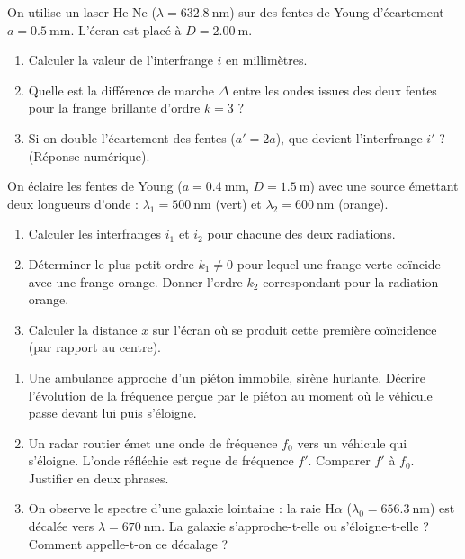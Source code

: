 \documentclass[11pt]{article}
\begin{document}
\begin{exercice}
On utilise un laser He-Ne ($\lambda = \SI{632,8}{\nano\meter}$) sur des fentes de Young d'écartement $a = \SI{0,5}{\milli\meter}$. L'écran est placé à $D = \SI{2,00}{\meter}$.
\begin{enumerate}
    \item Calculer la valeur de l'interfrange $i$ en millimètres.
    \item Quelle est la différence de marche $\Delta$ entre les ondes issues des deux fentes pour la frange brillante d'ordre $k=3$ ?
    \item Si on double l'écartement des fentes ($a' = 2a$), que devient l'interfrange $i'$ ? (Réponse numérique).
\end{enumerate}
\end{exercice}

\begin{exercice}
On éclaire les fentes de Young ($a = \SI{0,4}{\milli\meter}$, $D = \SI{1,5}{\meter}$) avec une source émettant deux longueurs d'onde : $\lambda_1 = \SI{500}{\nano\meter}$ (vert) et $\lambda_2 = \SI{600}{\nano\meter}$ (orange).
\begin{enumerate}
    \item Calculer les interfranges $i_1$ et $i_2$ pour chacune des deux radiations.
    \item Déterminer le plus petit ordre $k_1 \neq 0$ pour lequel une frange verte coïncide avec une frange orange. Donner l'ordre $k_2$ correspondant pour la radiation orange.
    \item Calculer la distance $x$ sur l'écran où se produit cette première coïncidence (par rapport au centre).
\end{enumerate}
\end{exercice}

\begin{exercice}
\begin{enumerate}
    \item Une ambulance approche d'un piéton immobile, sirène hurlante. Décrire l'évolution de la fréquence perçue par le piéton au moment où le véhicule passe devant lui puis s'éloigne.
    \item Un radar routier émet une onde de fréquence $f_0$ vers un véhicule qui s'éloigne. L'onde réfléchie est reçue de fréquence $f'$. Comparer $f'$ à $f_0$. Justifier en deux phrases.
    \item On observe le spectre d'une galaxie lointaine : la raie H$\alpha$ ($\lambda_0 = \SI{656,3}{\nano\meter}$) est décalée vers $\lambda = \SI{670}{\nano\meter}$. La galaxie s'approche-t-elle ou s'éloigne-t-elle ? Comment appelle-t-on ce décalage ?
\end{enumerate}
\end{exercice}
\end{document}
